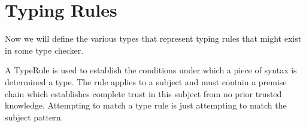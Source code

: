 \section{Typing Rules}
\label{section-rules}

Now we will define the various types that represent typing rules that
might exist in some type checker.

A TypeRule is used to establish the conditions under which a piece
of syntax is determined a type. The rule applies to a subject and
must contain a premise chain which establishes complete trust in
this subject from no prior trusted knowledge. Attempting to match
a type rule is just attempting to match the subject pattern.

